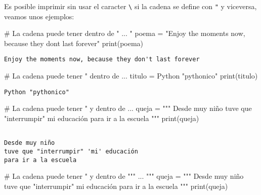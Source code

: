 \documentclass[
  letterpaper,
  DIV=11,
  numbers=noendperiod]{scrreprt}
\newenvironment{Shaded}{\begin{snugshade}}{\end{snugshade}}
\newcommand{\BuiltInTok}[1]{\textcolor[rgb]{0.00,0.23,0.31}{#1}}
\newcommand{\CommentTok}[1]{\textcolor[rgb]{0.37,0.37,0.37}{#1}}
\newcommand{\NormalTok}[1]{\textcolor[rgb]{0.00,0.23,0.31}{#1}}
\newcommand{\OperatorTok}[1]{\textcolor[rgb]{0.37,0.37,0.37}{#1}}
\newcommand{\StringTok}[1]{\textcolor[rgb]{0.13,0.47,0.30}{#1}}
\begin{document}
Es posible imprimir \texttt{\textquotesingle{}} sin usar el caracter
\texttt{\textbackslash{}} si la cadena se define con \texttt{"} y
viceversa, veamos unos ejemplos:

\begin{Shaded}
\begin{Highlighting}[]
\CommentTok{\# La cadena puede tener \textquotesingle{} dentro de " ... "}
\NormalTok{poema }\OperatorTok{=} \StringTok{"Enjoy the moments now, because they don\textquotesingle{}t last forever"}
\BuiltInTok{print}\NormalTok{(poema)}
\end{Highlighting}
\end{Shaded}

\begin{verbatim}
Enjoy the moments now, because they don't last forever
\end{verbatim}

\begin{Shaded}
\begin{Highlighting}[]
\CommentTok{\# La cadena puede tener " dentro de \textquotesingle{} ... \textquotesingle{}}
\NormalTok{titulo }\OperatorTok{=} \StringTok{\textquotesingle{}Python "pythonico" \textquotesingle{}}
\BuiltInTok{print}\NormalTok{(titulo)}
\end{Highlighting}
\end{Shaded}

\begin{verbatim}
Python "pythonico" 
\end{verbatim}

\begin{Shaded}
\begin{Highlighting}[]
\CommentTok{\# La cadena puede tener " y \textquotesingle{} dentro de \textquotesingle{}\textquotesingle{}\textquotesingle{} ... \textquotesingle{}\textquotesingle{}\textquotesingle{}}
\NormalTok{queja }\OperatorTok{=} \StringTok{"""}
\StringTok{Desde muy niño}
\StringTok{tuve que "interrumpir" \textquotesingle{}mi\textquotesingle{} educación}
\StringTok{para ir a la escuela}
\StringTok{"""}
\BuiltInTok{print}\NormalTok{(queja)}
\end{Highlighting}
\end{Shaded}

\begin{verbatim}

Desde muy niño
tuve que "interrumpir" 'mi' educación
para ir a la escuela
\end{verbatim}

\begin{Shaded}
\begin{Highlighting}[]
\CommentTok{\# La cadena puede tener " y \textquotesingle{} dentro de """ ... """}
\NormalTok{queja }\OperatorTok{=} \StringTok{"""}
\StringTok{Desde muy niño}
\StringTok{tuve que "interrumpir" \textquotesingle{}mi\textquotesingle{} educación}
\StringTok{para ir a la escuela}
\StringTok{"""}
\BuiltInTok{print}\NormalTok{(queja)}
\end{Highlighting}
\end{Shaded}
\end{document}
